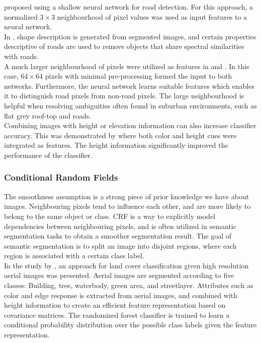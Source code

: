 \cite{Mokhtarzade_road_ann} proposed using a shallow neural network for road detection. For this approach, a normalized $3 \times 3$ neighbourhood of pixel values was used as input features to a neural network. \\

In \cite{Song_road_extraction_svm}, shape description is generated from segmented images, and certain properties descriptive of roads are used to remove objects that share spectral similarities with roads.\\

A much larger neighbourhood of pixels were utilized as features in \citep{Mnih_aerial_images_noisy} and \citep{Mnih_roads_high_res_aerial_images}. In this case, $64 \times 64$ pixels with minimal pre-processing formed the input to both  networks. Furthermore, the neural network learns suitable features which enables it to distinguish road pixels from non-road pixels. The large neighbourhood is helpful when resolving ambiguities often found in suburban environments, such as flat grey roof-top and roads. \\

  Combining images with height or elevation information can also increase classifier accuracy. This was demonstrated by \cite{Kluckner_semantic_height} where both color and height cues were integrated as features. The height information significantly improved the performance of the classifier.
  

\subsubsection{Conditional Random Fields}
The smoothness assumption is a strong piece of prior knowledge we have about images. Neighbouring pixels tend to influence each other, and are more likely to belong to the same object or class. \ac{CRF} is a way to explicitly model dependencies between neighbouring pixels, and is often utilized in semantic segmentation tasks to obtain a smoother segmentation result. The goal of semantic segmentation is to split an image into disjoint regions, where each region is associated with a certain class label.\\

In the study by \cite{Kluckner_semantic_height}, an approach for land cover classification given high resolution aerial images was presented. Aerial images are segmented according to five classes: Building, tree, waterbody, green area, and streetlayer. Attributes such as color and edge response is extracted from aerial images, and combined with height information to create an efficient feature representation based on covariance matrices. The randomized forest classifier is trained to learn a conditional probability distribution over the possible class labels given the feature representation.\\

